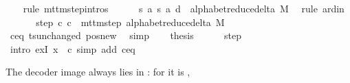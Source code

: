 \begin{isabellebody}
\ \ \isamarkupfalse%
\ {\isacharparenleft}{\kern0pt}rule\ mttm{\isacharunderscore}{\kern0pt}step{\isachardot}{\kern0pt}intros{\isacharparenright}{\kern0pt}\isanewline
\ \ \ \ \isamarkupfalse%
\ {\isachardoublequoteopen}{\isacharparenleft}{\kern0pt}{\isacharquery}{\kern0pt}s{\isacharcomma}{\kern0pt}\ {\isacharquery}{\kern0pt}a{\isacharcomma}{\kern0pt}\ {\isacharquery}{\kern0pt}s{\isacharprime}{\kern0pt}{\isacharcomma}{\kern0pt}\ {\isacharquery}{\kern0pt}a{\isacharcomma}{\kern0pt}\ {\isacharquery}{\kern0pt}d{\isacharparenright}{\kern0pt}\ {\isasymin}\ alphabet{\isacharunderscore}{\kern0pt}reduce{\isacharunderscore}{\kern0pt}delta\ M{\isachardoublequoteclose}\ \isamarkupfalse%
\ {\isacharparenleft}{\kern0pt}rule\ ard{\isacharunderscore}{\kern0pt}in{\isacharparenright}{\kern0pt}\isanewline
\ \ \isamarkupfalse%
\isanewline
\ \ \isamarkupfalse%
\ step{\isacharcolon}{\kern0pt}\ {\isachardoublequoteopen}{\isacharparenleft}{\kern0pt}c{\isacharprime}{\kern0pt}{\isacharcomma}{\kern0pt}\ {\isacharquery}{\kern0pt}c{\isacharprime}{\kern0pt}{\isacharprime}{\kern0pt}{\isacharparenright}{\kern0pt}\ {\isasymin}\ mttm{\isacharunderscore}{\kern0pt}step\ {\isacharparenleft}{\kern0pt}alphabet{\isacharunderscore}{\kern0pt}reduce{\isacharunderscore}{\kern0pt}delta\ M{\isacharparenright}{\kern0pt}{\isachardoublequoteclose}\isanewline
\ \ \ \ \isamarkupfalse%
\ c{\isacharprime}{\kern0pt}{\isacharunderscore}{\kern0pt}eq\ ts{\isacharunderscore}{\kern0pt}unchanged\ pos{\isacharunderscore}{\kern0pt}new\ \isamarkupfalse%
\ simp\isanewline
\ \ \isamarkupfalse%
\ {\isacharquery}{\kern0pt}thesis\isanewline
\ \ \ \ \isamarkupfalse%
\ step\ \isamarkupfalse%
\ {\isacharparenleft}{\kern0pt}intro\ exI{\isacharbrackleft}{\kern0pt}\ x\ {\isacharequal}{\kern0pt}\ {\isacharquery}{\kern0pt}c{\isacharprime}{\kern0pt}{\isacharprime}{\kern0pt}{\isacharbrackright}{\kern0pt}{\isacharparenright}{\kern0pt}\ {\isacharparenleft}{\kern0pt}simp\ add{\isacharcolon}{\kern0pt}\ c{\isacharprime}{\kern0pt}{\isacharunderscore}{\kern0pt}eq{\isacharparenright}{\kern0pt}\isanewline
{}\isamarkupfalse%
%
\endisatagproof
{\isafoldproof}%
%
\isadelimproof
%
\endisadelimproof
%
\begin{isamarkuptext}%
The decoder image always lies in : for
   it is ,

\end{isamarkuptext}
\end{isabellebody}
